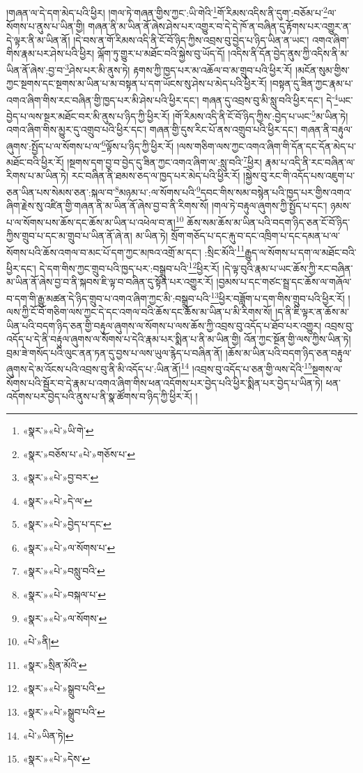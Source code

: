 །གཞན་ལ་དེ་དག་མེད་པའི་ཕྱིར། །གལ་ཏེ་གཞན་གྱིས་ཀྱང་:ཡི་གེའི་\footnote{«སྣར་»«པེ་»ཡི་གེ་}གོ་རིམས་འདིས་ནི་དུག་:བཅོམ་པ་\footnote{«སྣར་»བཅོས་པ་«པེ་»གཅོས་པ་}ལ་སོགས་པ་ནུས་པ་ཡིན་གྱི། གཞན་ནི་མ་ཡིན་ནོ་ཞེས་ཤེས་པར་འགྱུར་བ་དེ་དེ་ཁོ་ན་བཞིན་དུ་རྟོགས་པར་འགྱུར་ན་དེ་ལྟར་ནི་མ་ཡིན་ནོ། །དེ་བས་ན་གོ་རིམས་འདི་ནི་ངོ་བོ་ཉིད་ཀྱིས་འབྲས་བུ་བྱེད་པ་ཉིད་ཡིན་ན་ཡང་། འགའ་ཞིག་གིས་རྣམ་པར་ཤེས་པའི་ཕྱིར། ལྐོག་ཏུ་གྱུར་པ་མཐོང་བའི་སྐྱེས་བུ་ཡོད་དོ། །འདིས་ནི་དོན་བྱེད་ནུས་ཀྱི་འདིས་ནི་མ་ཡིན་ནོ་ཞེས་:བྱ་བ་\footnote{«སྣར་»«པེ་»བྱ་བར་}ཤེས་པར་མི་ནུས་ཏེ། རྟགས་ཀྱི་ཁྱད་པར་མ་འཆོལ་བ་མ་གྲུབ་པའི་ཕྱིར་རོ། །མངོན་སུམ་གྱིས་ཀྱང་སྔགས་དང་སྔགས་མ་ཡིན་པ་མ་བསྟན་པ་དག་ཡོངས་སུ་ཤེས་པ་མེད་པའི་ཕྱིར་རོ། །བསྟན་དུ་ཟིན་ཀྱང་རྣམ་པ་འགའ་ཞིག་གིས་རང་བཞིན་གྱི་ཁྱད་པར་མི་ཤེས་པའི་ཕྱིར་དང་། གཞན་དུ་འབྲས་བུ་མི་སླུ་བའི་ཕྱིར་དང་། དེ་\footnote{«སྣར་»«པེ་»དེ་ལ་}ཡང་བྱེད་པ་ལས་སྔར་མཐོང་བར་མི་ནུས་པ་ཉིད་ཀྱི་ཕྱིར་རོ། །གོ་རིམས་འདི་ནི་ངོ་བོ་ཉིད་ཀྱིས་:བྱེད་པ་ཡང་\footnote{«སྣར་»«པེ་»བྱེད་པ་དང་}མ་ཡིན་ཏེ། འགའ་ཞིག་གིས་མྱུར་དུ་འགྲུབ་པའི་ཕྱིར་དང་། གཞན་གྱི་དུས་རིང་པོ་ནས་འགྲུབ་པའི་ཕྱིར་དང་། གཞན་ནི་བརྟུལ་ཞུགས་:སྤྱོད་པ་ལ་སོགས་པ་ལ་\footnote{«སྣར་»«པེ་»ལ་སོགས་པ་}ལྟོས་པ་ཉིད་ཀྱི་ཕྱིར་རོ། །ལས་གཅིག་ལས་ཀྱང་འགའ་ཞིག་གི་དོན་དང་དོན་མེད་པ་མཐོང་བའི་ཕྱིར་རོ། །སྔགས་དག་བྱ་བ་བྱེད་དུ་ཟིན་ཀྱང་འགའ་ཞིག་ལ་:སླུ་བའི་\footnote{«སྣར་»«པེ་»བསླུ་བའི་}ཕྱིར། རྣམ་པ་འདི་ནི་རང་བཞིན་ལ་རིགས་པ་མ་ཡིན་ཏེ། རང་བཞིན་ནི་ཐམས་ཅད་ལ་ཁྱད་པར་མེད་པའི་ཕྱིར་རོ། །སྐྱེས་བུ་རང་གི་འདོད་པས་འཇུག་པ་ཅན་ཡིན་པས་སེམས་ཅན་:སྐལ་བ་\footnote{«སྣར་»«པེ་»བསྐལ་པ་}མཉམ་པ་:ལ་སོགས་པའི་\footnote{«སྣར་»«པེ་»ལ་སོགས་}དབང་གིས་སམ་བསྙེན་པའི་ཁྱད་པར་གྱིས་འགའ་ཞིག་རྗེས་སུ་འཛིན་གྱི་གཞན་ནི་མ་ཡིན་ནོ་ཞེས་བྱ་བ་ནི་རིགས་སོ། །གལ་ཏེ་བརྟུལ་ཞུགས་ཀྱི་སྤྱོད་པ་དང་། ཉམས་པ་ལ་སོགས་པས་ཆོས་དང་ཆོས་མ་ཡིན་པ་འཕེལ་བ་ན།\footnote{«པེ་»ནི།} ཆོས་སམ་ཆོས་མ་ཡིན་པའི་བདག་ཉིད་ཅན་ངོ་བོ་ཉིད་ཀྱིས་གྲུབ་པ་དང་མ་གྲུབ་པ་ཡིན་ནོ་ཞེ་ན། མ་ཡིན་ཏེ། སྲོག་གཅོད་པ་དང་རྐུ་བ་དང་འཁྲིག་པ་དང་དམན་པ་ལ་སོགས་པའི་ཆོས་འགལ་བ་མང་པོ་དག་ཀྱང་མཁའ་འགྲོ་མ་དང་། :སྲིང་མོའི་\footnote{«སྣར་»སྲིན་མོའི་}རྒྱུད་ལ་སོགས་པ་དག་ལ་མཐོང་བའི་ཕྱིར་དང་། དེ་དག་གིས་ཀྱང་གྲུབ་པའི་ཁྱད་པར་:བསྒྲུབ་པའི་\footnote{«སྣར་»«པེ་»སྒྲུབ་པའི་}ཕྱིར་རོ། །དེ་ལྟ་བུའི་རྣམ་པ་ཡང་ཆོས་ཀྱི་རང་བཞིན་མ་ཡིན་ནོ་ཞེས་བྱ་བ་ནི་སྐབས་ཇི་ལྟ་བ་བཞིན་དུ་སྟོན་པར་འགྱུར་རོ། །བྱམས་པ་དང་གཙང་སྦྲ་དང་ཆོས་ལ་གཞོལ་བ་དག་གི་རྒྱུ་མཚན་དེ་ཉིད་གྲུབ་པ་འགའ་ཞིག་ཀྱང་མི་:བསྒྲུབ་པའི་\footnote{«སྣར་»«པེ་»སྒྲུབ་པའི་}ཕྱིར་བཟློག་པ་དག་གིས་གྲུབ་པའི་ཕྱིར་རོ། །ལས་ཀྱི་ངོ་བོ་གཅིག་ལས་ཀྱང་དེ་དང་འགལ་བའི་ཆོས་དང་ཆོས་མ་ཡིན་པ་མི་རིགས་སོ། །ད་ནི་ཇི་ལྟར་ན་ཆོས་མ་ཡིན་པའི་བདག་ཉིད་ཅན་གྱི་བརྟུལ་ཞུགས་ལ་སོགས་པ་ལས་ཆོས་ཀྱི་འབྲས་བུ་འདོད་པ་ཐོབ་པར་འགྱུར། འབྲས་བུ་འདོད་པ་དེ་ནི་བརྟུལ་ཞུགས་ལ་སོགས་པ་དེའི་རྣམ་པར་སྨིན་པ་ནི་མ་ཡིན་གྱི། འོན་ཀྱང་སྔོན་གྱི་ལས་ཀྱིས་ཡིན་ཏེ། བྲམ་ཟེ་གསོད་པའི་ལུང་ནན་ཏན་དུ་བྱས་པ་ལས་ཡུལ་རྙེད་པ་བཞིན་ནོ། །ཆོས་མ་ཡིན་པའི་བདག་ཉིད་ཅན་བརྟུལ་ཞུགས་དེ་མ་འོངས་པའི་འབྲས་བུ་ནི་མི་འདོད་པ་:ཡིན་ནོ།\footnote{«པེ་»ཡིན་ཏེ།} །འབྲས་བུ་འདོད་པ་ཅན་གྱི་ལས་དེའི་\footnote{«སྣར་»«པེ་»དེས་}སྔགས་ལ་སོགས་པའི་སྦྱོར་བ་དེ་རྣམ་པ་འགའ་ཞིག་གིས་ཕན་འདོགས་པར་བྱེད་པའི་ཕྱིར་སྨིན་པར་བྱེད་པ་ཡིན་ཏེ། ཕན་འདོགས་པར་བྱེད་པའི་ནུས་པ་ནི་སྣ་ཚོགས་བ་ཉིད་ཀྱི་ཕྱིར་རོ། །
